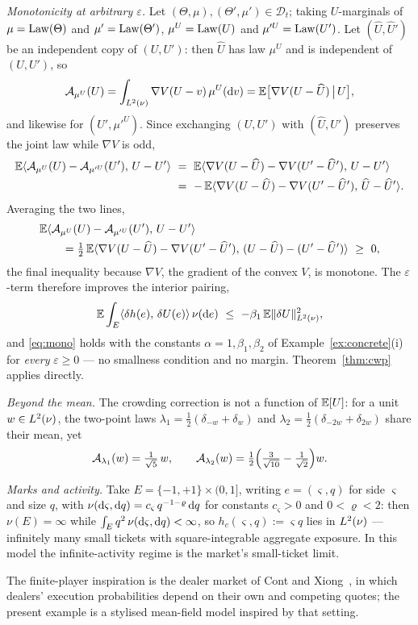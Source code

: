 \begin{example}
\smallskip
\emph{Monotonicity at arbitrary $\varepsilon$.} Let
$(\Theta,\mu),(\Theta',\mu')\in\mathcal D_t$; taking $U$-marginals of $\mu=\mathrm{Law}(\Theta)$
and $\mu'=\mathrm{Law}(\Theta')$, $\mu^U=\mathrm{Law}(U)$ and $\mu'^U=\mathrm{Law}(U')$. Let
$(\widehat U,\widehat U')$ be an independent copy of $(U,U')$: then $\widehat U$ has law
$\mu^U$ and is independent of $(U,U')$, so
\[
\mathcal A_{\mu^U}(U)=\int_{L^2(\nu)}\nabla V(U-v)\,\mu^U(\mathrm{d} v)
=\mathbb{E}\bigl[\nabla V(U-\widehat U)\,\big|\,U\bigr],
\]
and likewise for $(U',\mu'^U)$. Since
exchanging $(U,U')$ with $(\widehat U,\widehat U')$ preserves the joint law while
$\nabla V$ is odd,
\[
\begin{aligned}
\mathbb{E}\langle \mathcal A_{\mu^U}(U)-\mathcal A_{\mu'^U}(U'),\,U-U'\rangle
&\ =\ \mathbb{E}\langle \nabla V(U-\widehat U)-\nabla V(U'-\widehat U'),\,U-U'\rangle\\
&\ =\ -\,\mathbb{E}\langle \nabla V(U-\widehat U)-\nabla V(U'-\widehat U'),\,\widehat U-\widehat U'\rangle .
\end{aligned}
\]
Averaging the two lines,
\[
\begin{aligned}
&\mathbb{E}\langle \mathcal A_{\mu^U}(U)-\mathcal A_{\mu'^U}(U'),\,U-U'\rangle\\
&\qquad=\tfrac12\,\mathbb{E}\langle \nabla V(U-\widehat U)-\nabla V(U'-\widehat U'),\,(U-\widehat U)-(U'-\widehat U')\rangle\ \ge\ 0,
\end{aligned}
\]
the final inequality because $\nabla V$, the gradient of the convex $V$, is monotone.
The $\varepsilon$-term therefore improves the interior pairing,
\[
\mathbb{E}\int_E\langle \delta h(e),\,\delta U(e)\rangle\,\nu(\mathrm{d} e)\ \le\ -\beta_1\,\mathbb{E}\lVert \delta U\rVert_{L^2(\nu)}^2 ,
\]
and \eqref{eq:mono} holds with the constants $\alpha=1,\beta_1,\beta_2$ of
Example~\ref{ex:concrete}(i) for \emph{every} $\varepsilon\ge0$ --- no smallness
condition and no margin. Theorem~\ref{thm:cwp} applies directly.

\smallskip
\emph{Beyond the mean.} The crowding correction is not a function of $\mathbb{E}[U]$: for a
unit $w\in L^2(\nu)$, the two-point laws $\lambda_1=\tfrac12(\delta_{-w}+\delta_{w})$ and
$\lambda_2=\tfrac12(\delta_{-2w}+\delta_{2w})$ share their mean, yet
\[
\mathcal A_{\lambda_1}(w)=\tfrac{1}{\sqrt5}\,w,\qquad
\mathcal A_{\lambda_2}(w)=\tfrac12\Bigl(\tfrac{3}{\sqrt{10}}-\tfrac1{\sqrt2}\Bigr)w .
\]

\smallskip
\emph{Marks and activity.} Take $E=\{-1,+1\}\times(0,1]$, writing $e=(\varsigma,q)$ for
side $\varsigma$ and size $q$, with
$\nu(\mathrm{d}\varsigma,\mathrm{d} q)=c_\varsigma\,q^{-1-\varrho}\,\mathrm{d} q$ for constants
$c_\varsigma>0$ and $0<\varrho<2$: then $\nu(E)=\infty$ while
$\int_E q^2\,\nu(\mathrm{d}\varsigma,\mathrm{d} q)<\infty$, so $h_c(\varsigma,q):=\varsigma q$ lies
in $L^2(\nu)$ --- infinitely many small tickets with square-integrable aggregate exposure. In
this model the infinite-activity regime is the market's small-ticket limit.

The finite-player inspiration is the dealer market of Cont and
Xiong~\cite{ContXiong}, in which dealers' execution probabilities depend on their own
and competing quotes; the present example is a stylised mean-field model inspired by that
setting.
\end{example}

